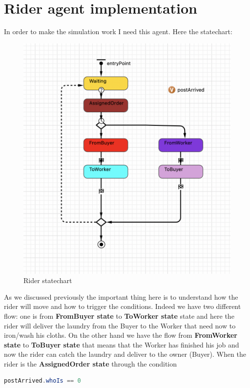 \section{Rider agent implementation}
In order to make the simulation work I need this agent. Here the statechart:
\begin{figure}[hbtp]
\caption{Rider statechart}
\centering
\includegraphics[scale=0.6]{../Images/riderstatechart.png}
\end{figure}
As we discussed previously the important thing here is to understand how the rider will move and how to trigger the conditions. Indeed we have two different flow: one is from \textbf{FromBuyer state} to \textbf{ToWorker state} state and here the rider will deliver the laundry from the Buyer to the Worker that need now to iron/wash his cloths. On the other hand we have the flow from \textbf{FromWorker state} to \textbf{ToBuyer state} that means that the Worker has finished his job and now the rider can catch the laundry and deliver to the owner (Buyer).
When the rider is the \textbf{AssignedOrder state} through the condition
\begin{lstlisting}[language=Java]
postArrived.whoIs == 0
\end{lstlisting} 
